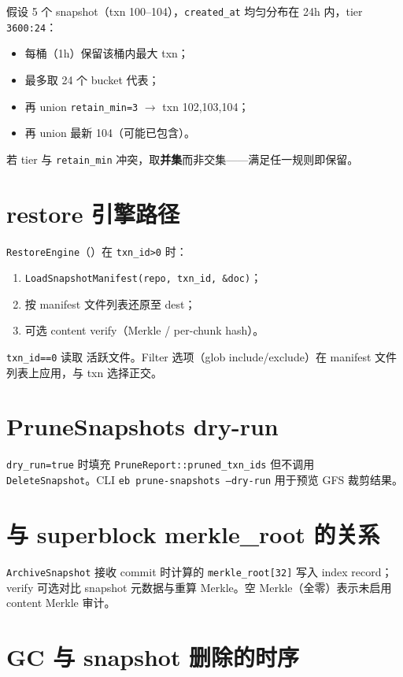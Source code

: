 假设 5 个 snapshot（txn 100--104），\texttt{created\_at} 均匀分布在 24h 内，tier \texttt{3600:24}：
\begin{itemize}[nosep]
  \item 每桶（1h）保留该桶内最大 txn；
  \item 最多取 24 个 bucket 代表；
  \item 再 union \texttt{retain\_min=3} $\rightarrow$ txn 102,103,104；
  \item 再 union 最新 104（可能已包含）。
\end{itemize}

若 tier 与 \texttt{retain\_min} 冲突，取\textbf{并集}而非交集——满足任一规则即保留。

\section{restore 引擎路径}

\texttt{RestoreEngine}（）在 \texttt{txn\_id>0} 时：
\begin{enumerate}[nosep]
  \item \texttt{LoadSnapshotManifest(repo, txn\_id, \&doc)}；
  \item 按 manifest 文件列表还原至 dest；
  \item 可选 content verify（Merkle / per-chunk hash）。
\end{enumerate}

\texttt{txn\_id==0} 读取  活跃文件。Filter 选项（glob include/exclude）在 manifest 文件列表上应用，与 txn 选择正交。

\section{PruneSnapshots dry-run}

\texttt{dry\_run=true} 时填充 \texttt{PruneReport::pruned\_txn\_ids} 但不调用 \texttt{DeleteSnapshot}。CLI \texttt{eb prune-snapshots --dry-run} 用于预览 GFS 裁剪结果。

\section{与 superblock merkle\_root 的关系}

\texttt{ArchiveSnapshot} 接收 commit 时计算的 \texttt{merkle\_root[32]} 写入 index record；verify 可选对比 snapshot 元数据与重算 Merkle。空 Merkle（全零）表示未启用 content Merkle 审计。

\section{GC 与 snapshot 删除的时序}

